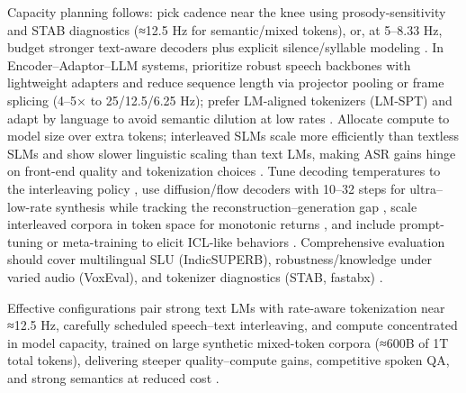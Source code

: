 Capacity planning follows: pick cadence near the knee using prosody-sensitivity and STAB diagnostics (≈12.5 Hz for semantic/mixed tokens), or, at 5–8.33 Hz, budget stronger text-aware decoders plus explicit silence/syllable modeling \cite{vashishth2024stabspeechtokenizerassessmentbenchmark,onda2025benchmarkingprosodyencodingdiscretespeec}. In Encoder–Adaptor–LLM systems, prioritize robust speech backbones with lightweight adapters and reduce sequence length via projector pooling or frame splicing (4–5× to 25/12.5/6.25 Hz); prefer LM-aligned tokenizers (LM‑SPT) and adapt by language to avoid semantic dilution at low rates \cite{wang2023slmbridgethingapbetweenspeechtextfoundat,jo2025lmsptalignedsemanticdistillationspeechto,zhang2025impactframeratesspeechtokenizercasestudy}. Allocate compute to model size over extra tokens; interleaved SLMs scale more efficiently than textless SLMs and show slower linguistic scaling than text LMs, making ASR gains hinge on front-end quality and tokenization choices \cite{cuervo2024scalingpropertiesspeechlanguagemodels,turetzky2024lastlanguagemodelawarespeechtokenization,kando2025exploringeffectsegmentationvocabularysiz,maimon2025scalinganalysisinterleavedspeechtextlang,zeng2024scalingspeechtextpretrainingsyntheticint}. Tune decoding temperatures to the interleaving policy \cite{cui2025thinkbeforeyoutalkenhancingmeaningfuldia}, use diffusion/flow decoders with 10–32 steps for ultra–low-rate synthesis while tracking the reconstruction–generation gap \cite{wang2025tadicodectextawarediffusionspeechtokeniz}, scale interleaved corpora in token space for monotonic returns \cite{zeng2024scalingspeechtextpretrainingsyntheticint}, and include prompt-tuning or meta-training to elicit ICL-like behaviors \cite{hsu2024exploringcontextlearningtextlessspeechla}. Comprehensive evaluation should cover multilingual SLU (IndicSUPERB), robustness/knowledge under varied audio (VoxEval), and tokenizer diagnostics (STAB, fastabx) \cite{entry2025indicsuperbspeechprocessinguniversalperf,cui2025voxevalbenchmarkingknowledgeunderstandin,vashishth2024stabspeechtokenizerassessmentbenchmark,poli2025fastabxlibraryefficientcomputationabxdis}.

Effective configurations pair strong text LMs with rate-aware tokenization near ≈12.5 Hz, carefully scheduled speech–text interleaving, and compute concentrated in model capacity, trained on large synthetic mixed-token corpora (≈600B of 1T total tokens), delivering steeper quality–compute gains, competitive spoken QA, and strong semantics at reduced cost \cite{maimon2025scalinganalysisinterleavedspeechtextlang,zhang2024speechtokenizerunifiedspeechtokenizerlar,zeng2024scalingspeechtextpretrainingsyntheticint,cuervo2024scalingpropertiesspeechlanguagemodels}.

















